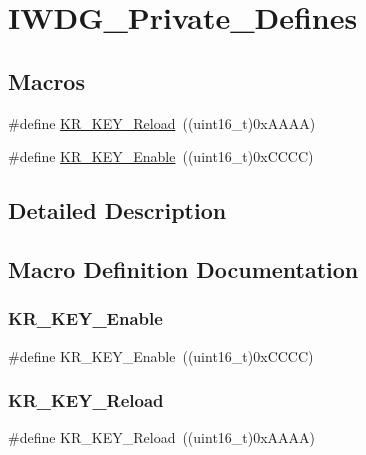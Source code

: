 \hypertarget{group___i_w_d_g___private___defines}{}\section{I\+W\+D\+G\+\_\+\+Private\+\_\+\+Defines}
\label{group___i_w_d_g___private___defines}
\subsection*{Macros}
\begin{DoxyCompactItemize}
\item 
\#define \mbox{\hyperlink{group___i_w_d_g___private___defines_gad5e5efc1dbd6a045da5a36c3d9df16a5}{K\+R\+\_\+\+K\+E\+Y\+\_\+\+Reload}}~((uint16\+\_\+t)0x\+A\+A\+A\+A)
\item 
\#define \mbox{\hyperlink{group___i_w_d_g___private___defines_ga833138e20c8a26786dd7ca3b132152ed}{K\+R\+\_\+\+K\+E\+Y\+\_\+\+Enable}}~((uint16\+\_\+t)0x\+C\+C\+C\+C)
\end{DoxyCompactItemize}


\subsection{Detailed Description}


\subsection{Macro Definition Documentation}
\mbox{\label{group___i_w_d_g___private___defines_ga833138e20c8a26786dd7ca3b132152ed}} 
\subsubsection{\texorpdfstring{KR\_KEY\_Enable}{KR\_KEY\_Enable}}
{\footnotesize\ttfamily \#define K\+R\+\_\+\+K\+E\+Y\+\_\+\+Enable~((uint16\+\_\+t)0x\+C\+C\+C\+C)}

\mbox{\label{group___i_w_d_g___private___defines_gad5e5efc1dbd6a045da5a36c3d9df16a5}} 
\subsubsection{\texorpdfstring{KR\_KEY\_Reload}{KR\_KEY\_Reload}}
{\footnotesize\ttfamily \#define K\+R\+\_\+\+K\+E\+Y\+\_\+\+Reload~((uint16\+\_\+t)0x\+A\+A\+A\+A)}

